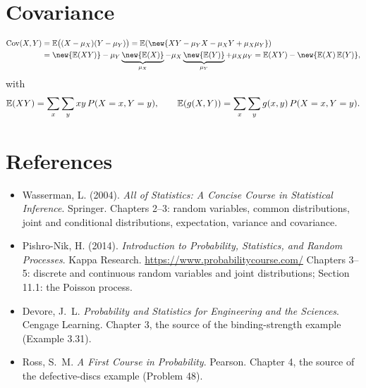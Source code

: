 \section{Covariance}
\begin{align*}
\Cov(X,Y) &= \E\big((X - \mu_X)(Y - \mu_Y)\big) = \E(\new{XY - \mu_Y X - \mu_X Y + \mu_X\mu_Y})\\
&= \new{\E(XY)} - \mu_Y\underbrace{\new{\E(X)}}_{\mu_X} - \mu_X\underbrace{\new{\E(Y)}}_{\mu_Y} + \mu_X\mu_Y
= \E(XY) - \new{\E(X)\,\E(Y)},
\end{align*}
with
\[
\mathbb{E}(XY) = \sum_x\sum_y xy\,P(X = x, Y = y), \qquad
\mathbb{E}(g(X,Y)) = \sum_x\sum_y g(x,y)\,P(X = x, Y = y).
\]

\section*{References}
\begin{itemize}
\item Wasserman, L. (2004). \emph{All of Statistics: A Concise Course in Statistical Inference}. Springer. Chapters 2--3: random variables, common distributions, joint and conditional distributions, expectation, variance and covariance.
\item Pishro-Nik, H. (2014). \emph{Introduction to Probability, Statistics, and Random Processes}. Kappa Research. \url{https://www.probabilitycourse.com/} Chapters 3--5: discrete and continuous random variables and joint distributions; Section 11.1: the Poisson process.
\item Devore, J.~L. \emph{Probability and Statistics for Engineering and the Sciences}. Cengage Learning. Chapter 3, the source of the binding-strength example (Example 3.31).
\item Ross, S.~M. \emph{A First Course in Probability}. Pearson. Chapter 4, the source of the defective-discs example (Problem 48).
\end{itemize}


